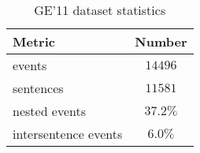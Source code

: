 \documentclass[11pt,a4paper]{article}
\newcommand{\GE}{\textrm{{\fontfamily{qcr}\selectfont GE'11} }}
\begin{document}
\begin{table}
\small
\centering
\begin{tabular}{lc}
\hline 
\textbf{Metric} & \textbf{Number} \\ \hline
events & $14496$ \\
sentences & $11581$ \\
nested events &  $37.2\%$ \\
intersentence events & $6.0\%$ \\


\hline
\end{tabular}
\caption{\label{font-table} \GE dataset statistics}
\label{table:ge11_stats}
\end{table} 
\end{document}
